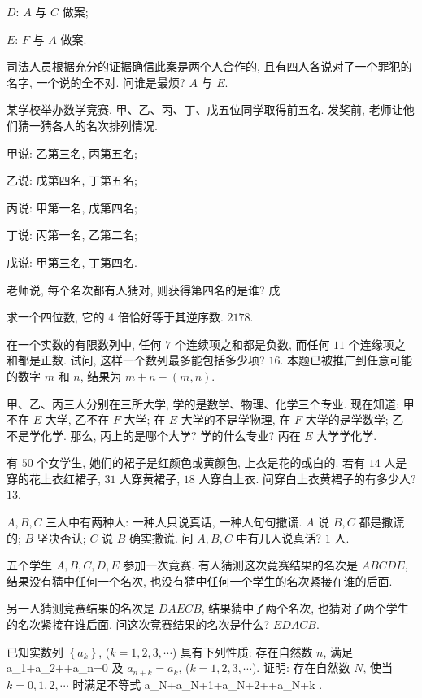 $D$: $A$ 与 $C$ 做案;

$E$: $F$ 与 $A$ 做案.

司法人员根据充分的证据确信此案是两个人合作的, 且有四人各说对了一个罪犯的名字, 
一个说的全不对. 问谁是最烦?
\eq
\ba
$A$ 与 $E$.
\ea

某学校举办数学竞赛, 甲、乙、丙、丁、戊五位同学取得前五名. 发奖前, 老师让他们猜一猜各人的名次排列情况.

甲说: 乙第三名, 丙第五名;

乙说: 戊第四名, 丁第五名;

丙说: 甲第一名, 戊第四名;

丁说: 丙第一名, 乙第二名;

戊说: 甲第三名, 丁第四名.

老师说, 每个名次都有人猜对, 则获得第四名的是谁?
\eq
\ba
戊
\ea

\bq{}{}
求一个四位数, 它的 $4$ 倍恰好等于其逆序数.
\eq
\ba
$2178$.
\ea

在一个实数的有限数列中, 任何 $7$ 个连续项之和都是负数, 而任何 $11$ 个连缘项之和都是正数. 试问, 这样一个数列最多能包括多少项?
\eq
\ba
$16$. 本题已被推广到任意可能的数字 $m$ 和 $n$, 结果为 $m+n-(m,n)$.
\ea

\bq{}{}
甲、乙、丙三人分别在三所大学, 学的是数学、物理、化学三个专业. 现在知道: 甲不在 $E$ 大学, 乙不在 $F$ 大学; 在 $E$ 大学的不是学物理, 在 $F$ 大学的是学数学; 乙 不是学化学. 那么, 丙上的是哪个大学? 学的什么专业?
\eq
\ba
丙在 $E$ 大学学化学.
\ea

\bq{}{}
有 $50$ 个女学生, 她们的裙子是红颜色或黄颜色, 上衣是花的或白的. 若有 $14$ 人是穿的花上衣红裙子, $31$ 人穿黄裙子, $18$ 人穿白上衣. 问穿白上衣黄裙子的有多少人?
\eq
\ba
$13$.
\ea

\bq{}{}
$A, B, C$ 三人中有两种人: 一种人只说真话, 一种人句句撒谎. $A$ 说 $B, C$ 都是撒谎的; $B$ 坚决否认; $C$ 说 $B$ 确实撒谎. 问 $A, B, C$ 中有几人说真话?
\eq
\ba
$1$ 人.
\ea

五个学生 $A, B, C, D, E$ 参加一次竟赛. 有人猜测这次竟赛结果的名次是 $A B C D E$, 结果没有猜中任何一个名次, 也没有猜中任何一个学生的名次紧接在谁的后面.

另一人猜测竞赛结果的名次是 $D A E C B$, 结果猜中了两个名次, 也猜对了两个学生的名次紧接在谁后面. 问这次竞赛结果的名次是什么?
\eq
\ba
$EDACB$.
\ea

已知实数列 $\left\{a_k\right\}$, ($k=1,2,3,\cdots$) 具有下列性质: 存在自然数 $n$, 满足
\bee
a_1+a_2+\cdots+a_n=0
\eee
及 $a_{n+k}=a_{k}$, ($k=1,2,3, \cdots$). 
证明: 存在自然数 $N$, 使当 $k=0,1,2, \cdots$ 时满足不等式
\bee
a_N+a_{N+1}+a_{N+2}+\cdots+a_{N+k} .
\eee
\eq

